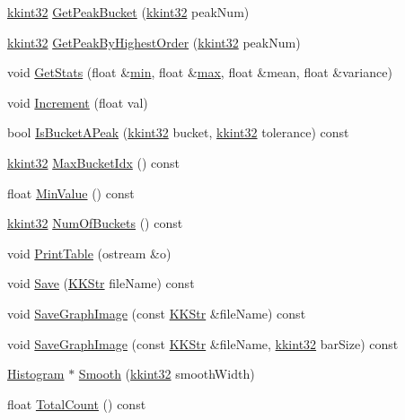 \begin{DoxyCompactItemize}
\hyperlink{namespace_k_k_b_a8fa4952cc84fda1de4bec1fbdd8d5b1b}{kkint32} \hyperlink{class_k_k_b_1_1_histogram_a71eef0fa7588f4e19f400dd1eabeaa66}{Get\+Peak\+Bucket} (\hyperlink{namespace_k_k_b_a8fa4952cc84fda1de4bec1fbdd8d5b1b}{kkint32} peak\+Num)
\item 
\hyperlink{namespace_k_k_b_a8fa4952cc84fda1de4bec1fbdd8d5b1b}{kkint32} \hyperlink{class_k_k_b_1_1_histogram_a7698e5943c9a8859fca49e2551ea0d04}{Get\+Peak\+By\+Highest\+Order} (\hyperlink{namespace_k_k_b_a8fa4952cc84fda1de4bec1fbdd8d5b1b}{kkint32} peak\+Num)
\item 
void \hyperlink{class_k_k_b_1_1_histogram_a42e01ea0343c3f9e62841c7498670703}{Get\+Stats} (float \&\hyperlink{_usf_cas_cor_8h_a8195a86b6d75b9a3939505e8bb50021e}{min}, float \&\hyperlink{_usf_cas_cor_8h_ab95f7757e11b270d27b95ec0d8e798b5}{max}, float \&mean, float \&variance)
\item 
void \hyperlink{class_k_k_b_1_1_histogram_a1be7a2f10e83373a0e0083b970e0adfa}{Increment} (float val)
\item 
bool \hyperlink{class_k_k_b_1_1_histogram_afdb9c9d0c533d0f960755ef34e625d52}{Is\+Bucket\+A\+Peak} (\hyperlink{namespace_k_k_b_a8fa4952cc84fda1de4bec1fbdd8d5b1b}{kkint32} bucket, \hyperlink{namespace_k_k_b_a8fa4952cc84fda1de4bec1fbdd8d5b1b}{kkint32} tolerance) const 
\item 
\hyperlink{namespace_k_k_b_a8fa4952cc84fda1de4bec1fbdd8d5b1b}{kkint32} \hyperlink{class_k_k_b_1_1_histogram_a7c058cf194af1bf96bf038b0068dc328}{Max\+Bucket\+Idx} () const 
\item 
float \hyperlink{class_k_k_b_1_1_histogram_a4e0c1f127f04b35e8383726b027daa10}{Min\+Value} () const 
\item 
\hyperlink{namespace_k_k_b_a8fa4952cc84fda1de4bec1fbdd8d5b1b}{kkint32} \hyperlink{class_k_k_b_1_1_histogram_a5ed817d12ec4f30eb761fcc4e57e42c7}{Num\+Of\+Buckets} () const 
\item 
void \hyperlink{class_k_k_b_1_1_histogram_ac6174f69f8eab1ce225996ffd39bf04a}{Print\+Table} (ostream \&o)
\item 
void \hyperlink{class_k_k_b_1_1_histogram_ad875d4652f38d49d9c2fd170afee0071}{Save} (\hyperlink{class_k_k_b_1_1_k_k_str}{K\+K\+Str} file\+Name) const 
\item 
void \hyperlink{class_k_k_b_1_1_histogram_a0638645f1b64aa0128b3af42360360e7}{Save\+Graph\+Image} (const \hyperlink{class_k_k_b_1_1_k_k_str}{K\+K\+Str} \&file\+Name) const 
\item 
void \hyperlink{class_k_k_b_1_1_histogram_a52bd7aeedb85f8fbca8e10d0aba8569a}{Save\+Graph\+Image} (const \hyperlink{class_k_k_b_1_1_k_k_str}{K\+K\+Str} \&file\+Name, \hyperlink{namespace_k_k_b_a8fa4952cc84fda1de4bec1fbdd8d5b1b}{kkint32} bar\+Size) const 
\item 
\hyperlink{class_k_k_b_1_1_histogram}{Histogram} $\ast$ \hyperlink{class_k_k_b_1_1_histogram_a3377c8afecd84c378025ef38e4a1d4ad}{Smooth} (\hyperlink{namespace_k_k_b_a8fa4952cc84fda1de4bec1fbdd8d5b1b}{kkint32} smooth\+Width)
\item 
float \hyperlink{class_k_k_b_1_1_histogram_a66e88a0cfafc8d08e2a95d7d2799d47a}{Total\+Count} () const 
\end{DoxyCompactItemize}


